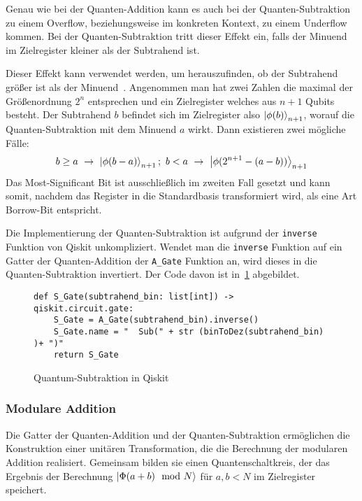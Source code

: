 Genau wie bei der Quanten-Addition kann es auch bei der Quanten-Subtraktion zu einem Overflow,
beziehungsweise im konkreten Kontext, zu einem Underflow kommen.
Bei der Quanten-Subtraktion tritt dieser Effekt ein, 
falls der Minuend im Zielregister kleiner als der Subtrahend ist.

Dieser Effekt kann verwendet werden, um herauszufinden, 
ob der Subtrahend größer ist als der Minuend~\cite{beauregard2003circuit}.
Angenommen man hat zwei Zahlen die maximal der Größenordnung \(2^n\) entsprechen und 
ein Zielregister welches aus \(n+1\) Qubits besteht.
Der Subtrahend \(b\) befindet sich im Zielregister also \(\ket{\phi(b)}_{n+1}\), 
worauf die Quanten-Subtraktion mit dem Minuend \(a\) wirkt.
Dann existieren zwei mögliche Fälle:
\[b \geq a~\rightarrow~\ket{\phi(b-a)}_{n+1};~
b < a~\rightarrow~\ket{\phi(2^{n+1}-(a-b))}_{n+1}
  \]
Das Most-Significant Bit ist ausschließlich im zweiten Fall gesetzt und kann somit, 
nachdem das Register in die Standardbasis transformiert wird, 
als eine Art Borrow-Bit entspricht.

Die Implementierung der Quanten-Subtraktion ist aufgrund der \texttt{inverse} Funktion von Qiskit unkompliziert.
Wendet man die \texttt{inverse} Funktion auf ein Gatter der Quanten-Addition der \texttt{A\_Gate} Funktion an, 
wird dieses in die Quanten-Subtraktion invertiert.
Der Code davon ist in~\ref{code:QuantumSub} abgebildet.
\begin{figure}[H]
  \caption{Quantum-Subtraktion in Qiskit}
  \label{code:QuantumSub}
\begin{verbatim}    
def S_Gate(subtrahend_bin: list[int]) -> qiskit.circuit.gate:
    S_Gate = A_Gate(subtrahend_bin).inverse()
    S_Gate.name = "  Sub(" + str (binToDez(subtrahend_bin) )+ ")"
    return S_Gate
  \end{verbatim}
\end{figure}

\subsubsection{Modulare Addition} \label{sub:modulareAddition}
Die Gatter der Quanten-Addition und der Quanten-Subtraktion ermöglichen die Konstruktion einer unitären Transformation, 
die die Berechnung der modularen Addition realisiert.
Gemeinsam bilden sie einen Quantenschaltkreis, 
der das Ergebnis der Berechnung \(\ket{\Phi(a+b)\mod N}\) für \(a, b < N\) im Zielregister speichert.

